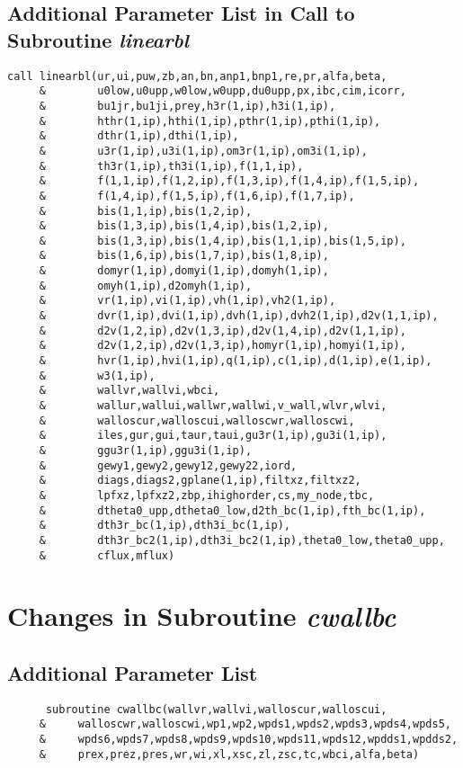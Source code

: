 \subsection*{Additional Parameter List in Call to Subroutine \emph{linearbl}}
\begin{verbatim}
call linearbl(ur,ui,puw,zb,an,bn,anp1,bnp1,re,pr,alfa,beta,
     &        u0low,u0upp,w0low,w0upp,du0upp,px,ibc,cim,icorr,
     &        bu1jr,bu1ji,prey,h3r(1,ip),h3i(1,ip),
     &        hthr(1,ip),hthi(1,ip),pthr(1,ip),pthi(1,ip),
     &        dthr(1,ip),dthi(1,ip),
     &        u3r(1,ip),u3i(1,ip),om3r(1,ip),om3i(1,ip),
     &        th3r(1,ip),th3i(1,ip),f(1,1,ip),
     &        f(1,1,ip),f(1,2,ip),f(1,3,ip),f(1,4,ip),f(1,5,ip),
     &        f(1,4,ip),f(1,5,ip),f(1,6,ip),f(1,7,ip),
     &        bis(1,1,ip),bis(1,2,ip),
     &        bis(1,3,ip),bis(1,4,ip),bis(1,2,ip),
     &        bis(1,3,ip),bis(1,4,ip),bis(1,1,ip),bis(1,5,ip),
     &        bis(1,6,ip),bis(1,7,ip),bis(1,8,ip),
     &        domyr(1,ip),domyi(1,ip),domyh(1,ip),
     &        omyh(1,ip),d2omyh(1,ip),
     &        vr(1,ip),vi(1,ip),vh(1,ip),vh2(1,ip),
     &        dvr(1,ip),dvi(1,ip),dvh(1,ip),dvh2(1,ip),d2v(1,1,ip),
     &        d2v(1,2,ip),d2v(1,3,ip),d2v(1,4,ip),d2v(1,1,ip),
     &        d2v(1,2,ip),d2v(1,3,ip),homyr(1,ip),homyi(1,ip),
     &        hvr(1,ip),hvi(1,ip),q(1,ip),c(1,ip),d(1,ip),e(1,ip),
     &        w3(1,ip),
     &        wallvr,wallvi,wbci,
     &        wallur,wallui,wallwr,wallwi,v_wall,wlvr,wlvi,
     &        walloscur,walloscui,walloscwr,walloscwi,
     &        iles,gur,gui,taur,taui,gu3r(1,ip),gu3i(1,ip),
     &        ggu3r(1,ip),ggu3i(1,ip),
     &        gewy1,gewy2,gewy12,gewy22,iord,
     &        diags,diags2,gplane(1,ip),filtxz,filtxz2,
     &        lpfxz,lpfxz2,zbp,ihighorder,cs,my_node,tbc,
     &        dtheta0_upp,dtheta0_low,d2th_bc(1,ip),fth_bc(1,ip),
     &        dth3r_bc(1,ip),dth3i_bc(1,ip),
     &        dth3r_bc2(1,ip),dth3i_bc2(1,ip),theta0_low,theta0_upp,
     &        cflux,mflux)
\end{verbatim}
\section{Changes in Subroutine \emph{cwallbc}}

\subsection*{Additional Parameter List}
\begin{verbatim}
      subroutine cwallbc(wallvr,wallvi,walloscur,walloscui,
     &     walloscwr,walloscwi,wp1,wp2,wpds1,wpds2,wpds3,wpds4,wpds5,
     &     wpds6,wpds7,wpds8,wpds9,wpds10,wpds11,wpds12,wpdds1,wpdds2,
     &     prex,prez,pres,wr,wi,xl,xsc,zl,zsc,tc,wbci,alfa,beta)

\end{verbatim}

